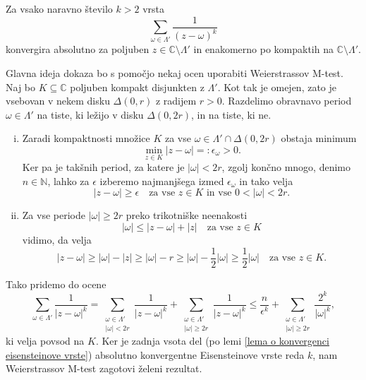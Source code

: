 \documentclass[mat1]{fmfdelo}
\numberwithin{equation}{section}
\newcommand{\N}{\mathbb N}
\newcommand{\C}{\mathbb C}
\newcommand{\om}{\omega}
\newcommand{\abs}[1]{\left\lvert #1 \right\rvert}
\theoremstyle{definition}
\begin{document}
\begin{lema}
    \label{lema o absolutni in enakomerni konvergenci}
    Za vsako naravno število $k > 2$ vrsta 
    \[
        \sum_{\om \in \Lambda'} \frac{1}{(z - \om)^k}
    \]
    konvergira absolutno za poljuben $z\in \C\setminus\Lambda'$ in enakomerno po kompaktih na $\C \setminus \Lambda'$. 
\end{lema}

\begin{dokaz}
    Glavna ideja dokaza bo s pomočjo nekaj ocen uporabiti Weierstrassov M-test. Naj bo $K \subseteq \C$ poljuben kompakt disjunkten z $\Lambda'$. Kot tak je omejen, zato je vsebovan v nekem disku $\Delta(0,r)$ z radijem $r > 0$. Razdelimo obravnavo period $\omega \in \Lambda'$ na tiste, ki ležijo v disku $\Delta(0,2r)$, in na tiste, ki ne.
    \begin{enumerate}[(i)]
        \item 
    Zaradi kompaktnosti množice $K$ za vse $\omega \in \Lambda' \cap \Delta(0,2r)$ obstaja minimum
    \[
        \min_{z \in K} \abs{z - \omega} =: \epsilon_\omega > 0.
    \]
    Ker pa je takšnih period, za katere je $\abs{\omega} < 2r$, zgolj končno mnogo, denimo $n \in \N$, lahko za $\epsilon$ izberemo najmanjšega izmed $\epsilon_\om$ in tako velja 
    \[
        \abs{z - \omega} \geq \epsilon \quad \text{za vse $z \in K$ in vse $0 < \abs{\omega} < 2r$.}  
    \]
    
    \item
    Za vse periode $\abs{\omega} \geq 2r$ preko trikotniške neenakosti
    \[
        \abs{\om} \leq \abs{z - \om} + \abs{z} \quad \text{za vse $z \in K$}
    \]
    vidimo, da velja 
    \[
        \abs{z - \om} \geq 
        \abs{\om} - \abs{z} \geq 
        \abs{\om} - r \geq 
        \abs{\om} - \frac{1}{2}\abs{\om} \geq
        \frac{1}{2}\abs{\om} \quad \text{za vse $z\in K$.}
    \]
    \end{enumerate}
    Tako pridemo do ocene
    \[
        \sum_{\om \in \Lambda'} \frac{1}{\abs{z - \om}^k} = 
        \sum_{\substack{\om \in \Lambda' \\ \abs{\om} < 2r}} \frac{1}{\abs{z - \om}^k} + \sum_{\substack{\om \in \Lambda' \\ \abs{\om} \geq 2r}} \frac{1}{\abs{z - \om}^k} \leq
        \frac{n}{\epsilon^k} + \sum_{\substack{\om \in \Lambda' \\ \abs{\om} \geq 2r}} \frac{2^k}{\abs{\om}^k},
    \]
    ki velja povsod na $K$. Ker je zadnja vsota del (po lemi \ref{lema o konvergenci eisensteinove vrste}) absolutno konvergentne Eisensteinove vrste reda $k$, nam Weierstrassov M-test zagotovi želeni rezultat.
\end{dokaz}
\end{document}
